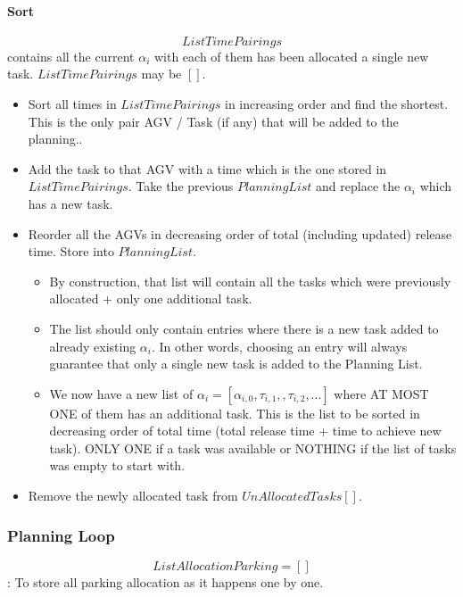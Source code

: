 \documentclass[12pt,a4paper]{article}
\begin{document}
\paragraph{Sort}
\[
ListTimePairings
\]
contains all the current $\alpha_i$ with each of them has been allocated a single new task. $ListTimePairings$ may be $[]$.

\begin{itemize}
\item Sort all times in $ListTimePairings$ in increasing order and find the shortest. This is the only pair AGV / Task (if any) that will be added to the planning..


\item Add the task to that AGV with a time which is the one stored in $ListTimePairings$. Take the previous $PlanningList$ and replace the $\alpha_i$ which has a new task.


\item Reorder all the AGVs in decreasing order of total (including updated) release time. Store into  $PlanningList$.

\begin{itemize}
\item By construction, that list will contain all the tasks which were previously allocated + only one additional task.


\item The list should only contain entries where there is a new task added to already existing $\alpha_i$. In other words, choosing an entry will always guarantee that only a single new task is added to the Planning List.


\item We now have a new list of $\alpha_i=[\alpha_{i, 0}, \tau_{i, 1}, , \tau_{i, 2}, ...]$ where AT MOST ONE of them has an additional task. This is the list to be sorted in decreasing order of total time (total release time + time to achieve new task). ONLY ONE if a task was available or NOTHING if the list of tasks was empty to start with.

\end{itemize}

\item Remove the newly allocated task from $UnAllocatedTasks[]$.

\end{itemize}
\subsubsection{Planning Loop}
\[
ListAllocationParking = []
\]
: To store all parking allocation as it happens one by one.
\end{document}
